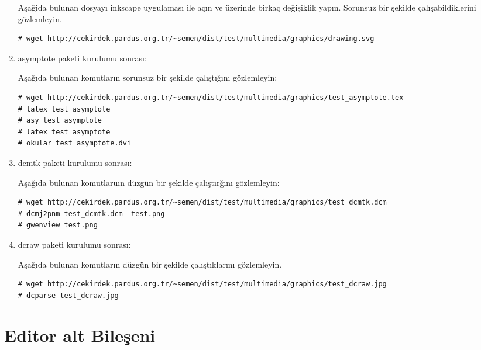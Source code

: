 \documentclass[a4paper,10pt]{article}
\begin{document}
\begin{enumerate}
Aşağida bulunan dosyayı inkscape uygulaması ile açın ve üzerinde birkaç değişiklik yapın. Sorunsuz bir şekilde çalışabildiklerini gözlemleyin.
\begin{verbatim}
# wget http://cekirdek.pardus.org.tr/~semen/dist/test/multimedia/graphics/drawing.svg 
\end{verbatim}

\item asymptote paketi kurulumu sonrası:

Aşağıda bulunan komutların sorunsuz bir şekilde çalıştığını gözlemleyin:
\begin{verbatim}
# wget http://cekirdek.pardus.org.tr/~semen/dist/test/multimedia/graphics/test_asymptote.tex
# latex test_asymptote
# asy test_asymptote
# latex test_asymptote
# okular test_asymptote.dvi
\end{verbatim}
\item  dcmtk paketi kurulumu sonrası:

Aşağıda bulunan komutlaruın düzgün bir şekilde çalıştırğını gözlemleyin:
\begin{verbatim}
# wget http://cekirdek.pardus.org.tr/~semen/dist/test/multimedia/graphics/test_dcmtk.dcm 
# dcmj2pnm test_dcmtk.dcm  test.png
# gwenview test.png
\end{verbatim}

\item dcraw paketi kurulumu sonrası:

Aşağıda bulunan komutların düzgün bir şekilde çalıştıklarını gözlemleyin.  
\begin{verbatim}
# wget http://cekirdek.pardus.org.tr/~semen/dist/test/multimedia/graphics/test_dcraw.jpg 
# dcparse test_dcraw.jpg 
\end{verbatim}

\end{enumerate}

\section{Editor alt Bileşeni}
\end{document}
